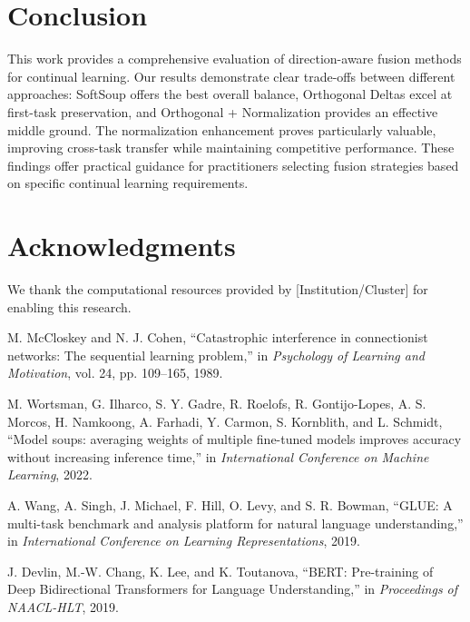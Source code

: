\documentclass[11pt,a4paper]{article}
\begin{document}
\section{Conclusion}

This work provides a comprehensive evaluation of direction-aware fusion methods for continual learning. Our results demonstrate clear trade-offs between different approaches: SoftSoup offers the best overall balance, Orthogonal Deltas excel at first-task preservation, and Orthogonal + Normalization provides an effective middle ground. The normalization enhancement proves particularly valuable, improving cross-task transfer while maintaining competitive performance. These findings offer practical guidance for practitioners selecting fusion strategies based on specific continual learning requirements.

\section*{Acknowledgments}

We thank the computational resources provided by [Institution/Cluster] for enabling this research.


\begin{thebibliography}{9}

M. McCloskey and N. J. Cohen,
``Catastrophic interference in connectionist networks: The sequential learning problem,''
in \emph{Psychology of Learning and Motivation}, vol. 24, pp. 109--165, 1989.

M. Wortsman, G. Ilharco, S. Y. Gadre, R. Roelofs, R. Gontijo-Lopes, A. S. Morcos, H. Namkoong, A. Farhadi, Y. Carmon, S. Kornblith, and L. Schmidt,
``Model soups: averaging weights of multiple fine-tuned models improves accuracy without increasing inference time,''
in \emph{International Conference on Machine Learning}, 2022.

A. Wang, A. Singh, J. Michael, F. Hill, O. Levy, and S. R. Bowman,
``GLUE: A multi-task benchmark and analysis platform for natural language understanding,''
in \emph{International Conference on Learning Representations}, 2019.

J. Devlin, M.-W. Chang, K. Lee, and K. Toutanova,
``BERT: Pre-training of Deep Bidirectional Transformers for Language Understanding,''
in \emph{Proceedings of NAACL-HLT}, 2019.

\end{thebibliography}
\end{document}
